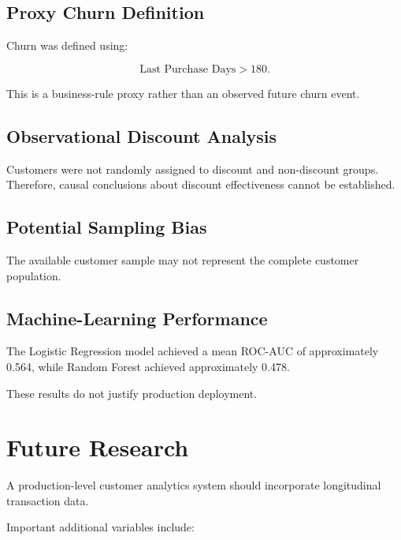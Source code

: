 \documentclass[11pt,a4paper]{article}
\begin{document}
\subsection{Proxy Churn Definition}

Churn was defined using:

\[
\text{Last Purchase Days}>180.
\]

This is a business-rule proxy rather than an observed future churn event.

\subsection{Observational Discount Analysis}

Customers were not randomly assigned to discount and non-discount groups. Therefore, causal conclusions about discount effectiveness cannot be established.

\subsection{Potential Sampling Bias}

The available customer sample may not represent the complete customer population.

\subsection{Machine-Learning Performance}

The Logistic Regression model achieved a mean ROC-AUC of approximately 0.564, while Random Forest achieved approximately 0.478.

These results do not justify production deployment.


\section{Future Research}

A production-level customer analytics system should incorporate longitudinal transaction data.

Important additional variables include:
\end{document}
